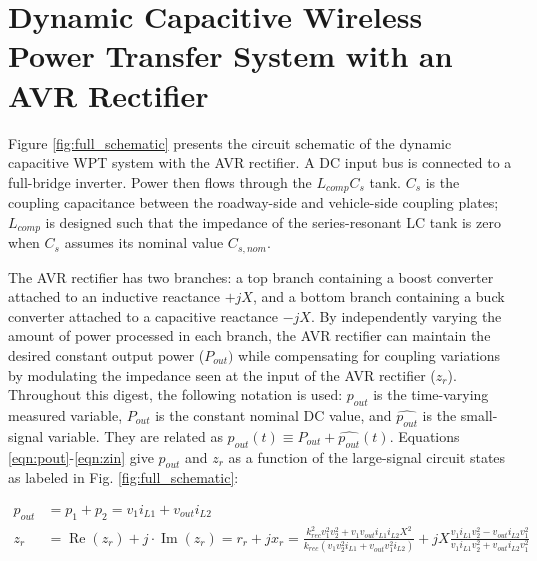 \documentclass[journal, onecolumn, final, letterpaper, 11pt]{IEEEtran}
\begin{document}
\section{Dynamic Capacitive Wireless Power Transfer System with an AVR Rectifier}
\label{sec:system}

Figure \ref{fig:full_schematic} presents the circuit schematic of the dynamic capacitive WPT system with the AVR rectifier. A DC input bus is connected to a full-bridge inverter. Power then flows through the $L_{comp}C_s$ tank. $C_s$ is the coupling capacitance between the roadway-side and vehicle-side coupling plates; $L_{comp}$ is designed such that the impedance of the series-resonant LC tank is zero when $C_s$ assumes its nominal value $C_{s,nom}$.

The AVR rectifier has two branches: a top branch containing a boost converter attached to an inductive reactance $+jX$, and a bottom branch containing a buck converter attached to a capacitive reactance $-jX$. By independently varying the amount of power processed in each branch, the AVR rectifier can maintain the desired constant output power ($P_{out})$ while compensating for coupling variations by modulating the impedance seen at the input of the AVR rectifier ($z_r$). Throughout this digest, the following notation is used: $p_{out}$ is the time-varying measured variable, $P_{out}$ is the constant nominal DC value, and $\widehat{p_{out}}$ is the small-signal variable. They are related as $p_{out}(t) \equiv P_{out} + \widehat{p_{out}}(t)$. Equations \ref{eqn:pout}-\ref{eqn:zin} give $p_{out}$ and $z_r$ as a function of the large-signal circuit states as labeled in Fig. \ref{fig:full_schematic}:

\footnotesize
\vspace{-0.8cm}
\begin{subequations}\label{eqn:pout_zin}
	\begin{align}
		p_{out} &= p_1 + p_2 = v_1 i_{L1} + v_{out} i_{L2} \label{eqn:pout} \\
		z_r &= \operatorname{Re}(z_r) + j\cdot\operatorname{Im}(z_r) = r_r + jx_r = \frac{k_{rec}^2 v_1^2 v_2^2 + v_1v_{out}i_{L1}i_{L2}X^2}{k_{rec}(v_1v_2^2i_{L1} + v_{out}v_1^2i_{L2})} + jX\frac{v_1 i_{L1}v_2^2 - v_{out} i_{L2}v_1^2}{v_1 i_{L1}v_2^2 + v_{out} i_{L2}v_1^2} \label{eqn:zin}
	\end{align}
\end{subequations}
\normalsize

\vspace{-0.2cm}
\end{document}
